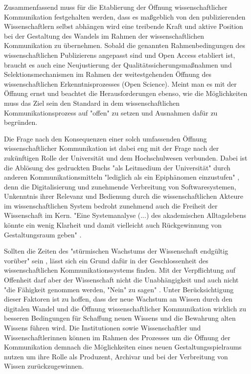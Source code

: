 Zusammenfassend muss für die Etablierung der Öffnung wissenschaftlicher Kommunikation festgehalten werden, dass es maßgeblich von den publizierenden Wissenschaftlern selbst abhängen wird eine treibende Kraft und aktive Position bei der Gestaltung des Wandels im Rahmen der wissenschaftlichen Kommunikation zu übernehmen. Sobald die genannten Rahmenbedingungen des wissenschaftlichen Publizierens angepasst sind und Open Access etabliert ist, braucht es auch eine Neujustierung der Qualitätssicherungsmaßnahmen und Selektionsmechanismen im Rahmen der weitestgehenden Öffnung des wissenschaftlichen Erkenntnisprozesses (Open Science). Meint man es mit der Öffnung ernst und beachtet die Herausforderungen ebenso, wie die Möglichkeiten muss das Ziel sein den Standard in dem wissenschaftlichen Kommunikationsprozess auf "offen" zu setzen und Ausnahmen dafür zu begründen.

Die Frage nach den Konsequenzen einer solch umfassenden Öffnung wissenschaftlicher Kommunikation ist dabei eng mit der Frage nach der zukünftigen Rolle der Universität und dem Hochschulwesen verbunden. Dabei ist die Ablösung des gedruckten Buchs "als Leitmedium der Universität" durch anderen Kommunikationsmitteln "lediglich als ein Epiphänomen einzustufen" \cite{Warnke_2012}, denn die Digitalisierung und zunehmende Verbreitung von Softwaresystemen, Unkenntnis ihrer Relevanz und Bedienung durch die wissenschaftlichen Akteure im wissenschaftlichen System bedroht zunehmend auch die Freiheit der Wissenschaft im Kern. "Eine Systemanalyse (...) des akademischen Alltagslebens  könnte ein wenig Klarheit und damit vielleicht auch Rückgewinnung von Gestaltungsraum geben" \cite{Warnke_2012}.

 Sollten die Zeiten des "stürmischen Wachstums der Wissenschaft endgültig vorüber" sein \cite{K_lbel_2002}, lässt sich ein Grund dafür in der Geschlossenheit des wissenschaftlichen Kommunikationssystems finden. Mit der Verpflichtung auf Offenheit darf aber der Wissenschaft nicht die Unabhängigkeit und auch nicht "die Fähigkeit genommen werden, "Nein" zu sagen" \cite{suchen_Hornbostel_2006}. Unter Berücksichtigung dieser Faktoren ist zu hoffen, dass der neue Wachstum an Wissen durch den digitalen Wandel und die Öffnung wissenschaftlicher Kommunikation wirklich zu besseren Bedingungen für Schaffung neuen Wissens und die Bewahrung alten Wissens führen wird. Die Institutionen sowie Wissenschaftler und Wissenschaftlerinnen können im Rahmen des Prozesses um die Öffnung der Kommunikation demnach die Möglichkeiten eines neuen Gestaltungsspielraums nutzen um ihre Rolle als Produzent, Archivar und bei der Verbreitung von Wissen zurückzugewinnen.

